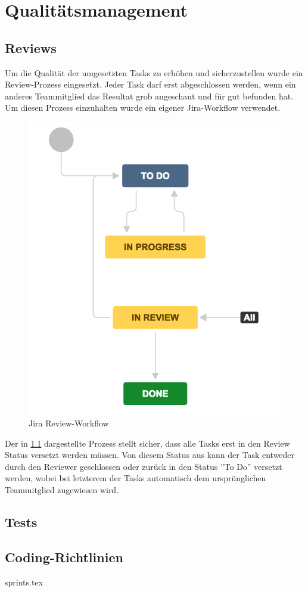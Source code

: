 \chapter{Qualitätsmanagement}

\section{Reviews}

Um die Qualität der umgesetzten Tasks zu erhöhen und sicherzustellen wurde ein Review-Prozess eingesetzt. Jeder Task darf erst abgeschlossen werden, wenn ein anderes Teammitglied das Resultat grob angeschaut und für gut befunden hat. Um diesen Prozess einzuhalten wurde ein eigener Jira-Workflow verwendet.

\begin{figure}
\centering
\includegraphics[width=0.7\linewidth]{content/projektmanagement/fig/jira-workflow}
\caption{Jira Review-Workflow}
\label{fig:jira-workflow}
\end{figure}

Der in \cref{fig:jira-workflow} dargestellte Prozess stellt sicher, dass alle Tasks erst in den Review Status versetzt werden müssen. Von diesem Status aus kann der Task entweder durch den Reviewer geschlossen oder zurück in den Status ''To Do'' versetzt werden, wobei bei letzterem der Tasks automatisch dem ursprünglichen Teammitglied zugewiesen wird.



\section{Tests}



\section{Coding-Richtlinien}


{sprints.tex}


